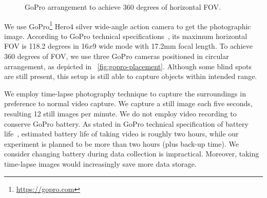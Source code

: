 	\begin{figure}[ht]
	\centering
	\hfill
	\caption{GoPro arrangement to achieve 360 degrees of horizontal \ac{FOV}.}
	\label{fig:gopro-placement}
	\end{figure}

	We use GoPro\footnote{\url{https://gopro.com}} Hero4 silver wide-angle action camera to get the photographic image. According to GoPro technical specifications~\cite{goprofieldofview}, its maximum horizontal \ac{FOV} is 118.2 degrees in 16$x$9 wide mode with 17.2mm focal length. To achieve 360 degrees of \ac{FOV}, we use three GoPro cameras positioned in circular arrangement, as depicted in ~\autoref{fig:gopro-placement}. Although some blind spots are still present, this setup is still able to capture objects within intended range.

	We employ time-lapse photography technique to capture the surroundings in preference to normal video capture. We capture a still image each five seconds, resulting 12 still images per minute. We do not employ video recording to conserve GoPro battery. As stated in GoPro technical specification of battery life~\cite{goprobattery}, estimated battery life of taking video is roughly two hours, while our experiment is planned to be more than two hours (plus back-up time). We consider changing battery during data collection is impractical. Moreover, taking time-lapse images would increasingly save more data storage.
	
